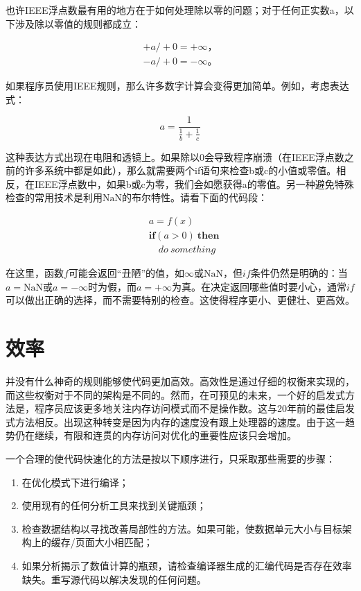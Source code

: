 \documentclass[lang=cn,12pt]{elegantbook}
\begin{document}
也许IEEE浮点数最有用的地方在于如何处理除以零的问题；对于任何正实数a，以下涉及除以零值的规则都成立：

\[
  \begin{aligned}
  +a /+0=+\infty， \\
  -a /+0=-\infty。 
  \end{aligned}
\]


如果程序员使用IEEE规则，那么许多数字计算会变得更加简单。例如，考虑表达式：

\[a=\frac{1}{\frac{1}{b}+\frac{1}{c}}\]

这种表达方式出现在电阻和透镜上。如果除以0会导致程序崩溃（在IEEE浮点数之前的许多系统中都是如此），那么就需要两个if语句来检查b或c的小值或零值。相反，在IEEE浮点数中，如果b或c为零，我们会如愿获得a的零值。另一种避免特殊检查的常用技术是利用$\mathrm{NaN}$的布尔特性。请看下面的代码段：

\[
  \begin{aligned}
  &a=f(x) \\
  &\textbf{if}(a>0) \  \textbf{then} \\ 
  &\quad do \  something
  \end{aligned}
\]

在这里，函数$f$可能会返回“丑陋”的值，如$\infty$或$\mathrm{NaN}$，但$if$条件仍然是明确的：当$a=\mathrm{NaN}$或$a=-\infty$时为假，而$a=+\infty$为真。在决定返回哪些值时要小心，通常$if$可以做出正确的选择，而不需要特别的检查。这使得程序更小、更健壮、更高效。

\section{效率}

并没有什么神奇的规则能够使代码更加高效。高效性是通过仔细的权衡来实现的，而这些权衡对于不同的架构是不同的。然而，在可预见的未来，一个好的启发式方法是，程序员应该更多地关注内存访问模式而不是操作数。这与20年前的最佳启发式方法相反。出现这种转变是因为内存的速度没有跟上处理器的速度。由于这一趋势仍在继续，有限和连贯的内存访问对优化的重要性应该只会增加。

一个合理的使代码快速化的方法是按以下顺序进行，只采取那些需要的步骤：

\begin{enumerate}
  \item 在优化模式下进行编译；
  \item 使用现有的任何分析工具来找到关键瓶颈；
  \item 检查数据结构以寻找改善局部性的方法。如果可能，使数据单元大小与目标架构上的缓存/页面大小相匹配；
  \item 如果分析揭示了数值计算的瓶颈，请检查编译器生成的汇编代码是否存在效率缺失。重写源代码以解决发现的任何问题。
\end{enumerate}
\end{document}
